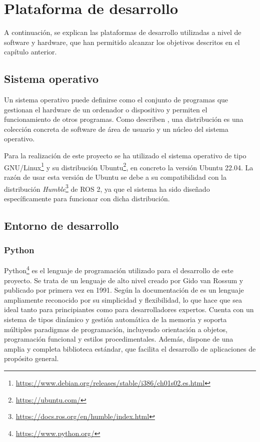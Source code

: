 \chapter{Plataforma de desarrollo}
\label{cap:capitulo3}


A continuación, se explican las plataformas de desarrollo utilizadas a nivel de software y hardware, que han permitido alcanzar los objetivos descritos en el capítulo anterior.

\section{Sistema operativo}
\label{sec:distribuicion}

Un sistema operativo puede definirse como el conjunto de programas que gestionan el hardware de un ordenador o dispositivo y permiten el funcionamiento de otros programas.
Como describen \cite{perales9a}, una distribución es una colección concreta de software de área de usuario y un núcleo del sistema operativo.

Para la realización de este proyecto se ha utilizado el sistema operativo de tipo GNU/Linux\footnote{\url{https://www.debian.org/releases/stable/i386/ch01s02.es.html}} y su distribución Ubuntu\footnote{\url{https://ubuntu.com/}}, en concreto la versión Ubuntu 22.04.
La razón de usar esta versión de Ubuntu se debe a su compatibilidad con la distribución \textit{Humble}\footnote{\url{https://docs.ros.org/en/humble/index.html}} de ROS 2, ya que el sistema ha sido diseñado específicamente para funcionar con dicha distribución.

\section{Entorno de desarrollo}
\label{sec:entornos}

\subsection{Python}
\label{sec:entornos}

Python\footnote{\url{https://www.python.org/}} es el lenguaje de programación utilizado para el desarrollo de este proyecto.
Se trata de un lenguaje de alto nivel creado por Gido van Rossum y publicado por primera vez en 1991.
Según la documentación de \cite{perales9b} es un lenguaje ampliamente reconocido por su simplicidad y flexibilidad, lo que hace que sea ideal tanto para principiantes como para desarrolladores expertos. Cuenta con un sistema de tipos dinámico y gestión automática de la memoria y soporta múltiples paradigmas de programación, incluyendo orientación a objetos, programación funcional y estilos procedimentales. Además, dispone de una amplia y completa biblioteca estándar, que facilita el desarrollo de aplicaciones de propósito general.


